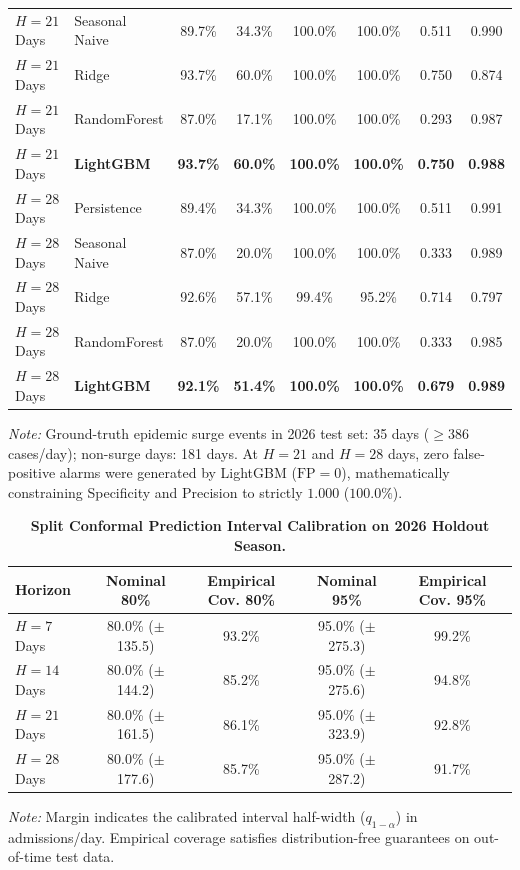 \documentclass[11pt,a4paper]{article}
\begin{document}
\begin{table}[t]
\begin{tabular*}{\textwidth}{@{\extracolsep{\fill}}llcccccc@{}}
$H=21$ Days & Seasonal Naive & 89.7\% & 34.3\% & 100.0\% & 100.0\% & 0.511 & 0.990 \\
$H=21$ Days & Ridge & 93.7\% & 60.0\% & 100.0\% & 100.0\% & 0.750 & 0.874 \\
$H=21$ Days & RandomForest & 87.0\% & 17.1\% & 100.0\% & 100.0\% & 0.293 & 0.987 \\
$H=21$ Days & \textbf{LightGBM} & \textbf{93.7\%} & \textbf{60.0\%} & \textbf{100.0\%} & \textbf{100.0\%} & \textbf{0.750} & \textbf{0.988} \\
\midrule
$H=28$ Days & Persistence & 89.4\% & 34.3\% & 100.0\% & 100.0\% & 0.511 & 0.991 \\
$H=28$ Days & Seasonal Naive & 87.0\% & 20.0\% & 100.0\% & 100.0\% & 0.333 & 0.989 \\
$H=28$ Days & Ridge & 92.6\% & 57.1\% & 99.4\% & 95.2\% & 0.714 & 0.797 \\
$H=28$ Days & RandomForest & 87.0\% & 20.0\% & 100.0\% & 100.0\% & 0.333 & 0.985 \\
$H=28$ Days & \textbf{LightGBM} & \textbf{92.1\%} & \textbf{51.4\%} & \textbf{100.0\%} & \textbf{100.0\%} & \textbf{0.679} & \textbf{0.989} \\
\bottomrule
\end{tabular*}
\begin{flushleft}
\footnotesize{\textit{Note:} Ground-truth epidemic surge events in 2026 test set: 35 days ($\ge 386$ cases/day); non-surge days: 181 days. At $H=21$ and $H=28$ days, zero false-positive alarms were generated by LightGBM ($\text{FP} = 0$), mathematically constraining Specificity and Precision to strictly $1.000$ ($100.0\%$).}
\end{flushleft}
\end{table}
\begin{table}[t]
\centering
\small
\caption{\textbf{Split Conformal Prediction Interval Calibration on 2026 Holdout Season.}}
\label{tab:table5}
\begin{tabular*}{\columnwidth}{@{\extracolsep{\fill}}lcccc@{}}
\toprule
\textbf{Horizon} & \textbf{Nominal 80\%} & \textbf{Empirical Cov. 80\%} & \textbf{Nominal 95\%} & \textbf{Empirical Cov. 95\%} \\
\midrule
$H=7$ Days & 80.0\% ($\pm$135.5) & 93.2\% & 95.0\% ($\pm$275.3) & 99.2\% \\
$H=14$ Days & 80.0\% ($\pm$144.2) & 85.2\% & 95.0\% ($\pm$275.6) & 94.8\% \\
$H=21$ Days & 80.0\% ($\pm$161.5) & 86.1\% & 95.0\% ($\pm$323.9) & 92.8\% \\
$H=28$ Days & 80.0\% ($\pm$177.6) & 85.7\% & 95.0\% ($\pm$287.2) & 91.7\% \\
\bottomrule
\end{tabular*}
\begin{flushleft}
\footnotesize{\textit{Note:} Margin indicates the calibrated interval half-width ($q_{1-\alpha}$) in admissions/day. Empirical coverage satisfies distribution-free guarantees on out-of-time test data.}
\end{flushleft}
\end{table}
\end{document}

